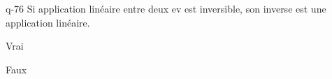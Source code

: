 \begin{truefalse}{q-76}
Si application linéaire entre deux ev est inversible, son inverse est une application linéaire.
\item* Vrai
\item Faux
\end{truefalse}

